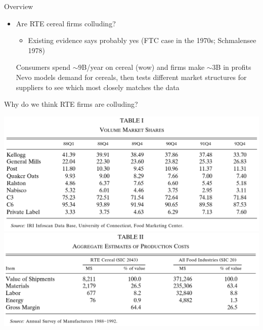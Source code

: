 \documentclass[dvipsnames]{beamer}
\begin{document}
\begin{frame}{Overview}
  \begin{itemize}
  \item Are RTE cereal firms colluding?
    \begin{itemize}
    \item Existing evidence says probably yes (FTC case in the 1970s; Schmalensee 1978)
    \end{itemize}
    \vitem Consumers spend $\sim 9$B/year on cereal (wow) and firms make $\sim 3$B in profits 
\vitem Nevo models demand for cereals, then tests different market structures for suppliers to see which most closely matches the data
  \end{itemize}
\end{frame}
%
\begin{frame}{Why do we think RTE firms are colluding?}
  \begin{center}
 \includegraphics[width=.8\textwidth, keepaspectratio=true]{tab1.png} 
 \\
 \includegraphics[width=.8\textwidth, keepaspectratio=true]{tab2.png} 
 \end{center}
\end{frame}
\end{document}
